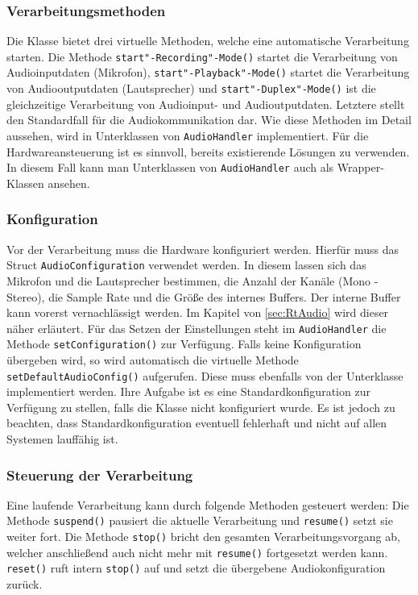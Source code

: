 \subsubsection{Verarbeitungsmethoden}
Die Klasse bietet drei virtuelle Methoden, welche eine automatische Verarbeitung starten. Die Methode \texttt{start"-Recording"-Mode()} startet die Verarbeitung von Audioinputdaten (Mikrofon), \texttt{start"-Playback"-Mode()} startet die Verarbeitung von Audiooutputdaten (Lautsprecher) und \texttt{start"-Duplex"-Mode()} ist die gleichzeitige Verarbeitung von Audioinput- und Audioutputdaten. Letztere stellt den Standardfall für die Audiokommunikation dar. Wie diese Methoden im Detail aussehen, wird in Unterklassen von \texttt{AudioHandler} implementiert. Für die Hardwareansteuerung ist es sinnvoll, bereits existierende Lösungen zu verwenden. In diesem Fall kann man Unterklassen von \texttt{AudioHandler} auch als Wrapper-Klassen ansehen.

\subsubsection{Konfiguration}
Vor der Verarbeitung muss die Hardware konfiguriert werden. Hierfür muss das Struct \texttt{AudioConfiguration} verwendet werden. In diesem lassen sich das Mikrofon und die Lautsprecher bestimmen, die Anzahl der Kanäle (Mono - Stereo), die Sample Rate und die Größe des internes Buffers. Der interne Buffer kann vorerst vernachlässigt werden. Im Kapitel von \ref{sec:RtAudio} wird dieser näher erläutert. Für das Setzen der Einstellungen steht im \texttt{AudioHandler} die Methode \texttt{setConfiguration()} zur Verfügung. Falls keine Konfiguration übergeben wird, so wird automatisch die virtuelle Methode \texttt{setDefaultAudioConfig()} aufgerufen. Diese muss ebenfalls von der Unterklasse implementiert werden. Ihre Aufgabe ist es eine Standardkonfiguration zur Verfügung zu stellen, falls die Klasse nicht konfiguriert wurde. Es ist jedoch zu beachten, dass Standardkonfiguration eventuell fehlerhaft und nicht auf allen Systemen lauffähig ist.

\subsubsection{Steuerung der Verarbeitung}
Eine laufende Verarbeitung kann durch folgende Methoden gesteuert werden: Die Methode \texttt{suspend()} pausiert die aktuelle Verarbeitung und \texttt{resume()} setzt sie weiter fort. Die Methode \texttt{stop()} bricht den gesamten Verarbeitungsvorgang ab, welcher anschließend auch nicht mehr mit \texttt{resume()} fortgesetzt werden kann. \texttt{reset()} ruft intern \texttt{stop()} auf und setzt die übergebene Audiokonfiguration zurück.


